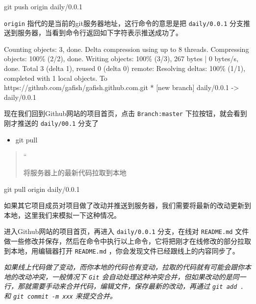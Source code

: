 \documentclass[
]{article}
\newenvironment{Shaded}{}{}
\newcommand{\NormalTok}[1]{#1}
\begin{document}
\begin{Shaded}
\begin{Highlighting}[]
\NormalTok{git push origin daily/0.0.1}
\end{Highlighting}
\end{Shaded}

\texttt{origin} 指代的是当前的git服务器地址，这行命令的意思是把
\texttt{daily/0.0.1}
分支推送到服务器，当看到命令行返回如下字符表示推送成功了。

\begin{Shaded}
\begin{Highlighting}[]
\NormalTok{Counting objects: 3, done.}
\NormalTok{Delta compression using up to 8 threads.}
\NormalTok{Compressing objects: 100\% (2/2), done.}
\NormalTok{Writing objects: 100\% (3/3), 267 bytes | 0 bytes/s, done.}
\NormalTok{Total 3 (delta 1), reused 0 (delta 0)}
\NormalTok{remote: Resolving deltas: 100\% (1/1), completed with 1 local objects.}
\NormalTok{To https://github.com/gafish/gafish.github.com.git}
\NormalTok{ * [new branch]      daily/0.0.1 {-}\textgreater{} daily/0.0.1}
\end{Highlighting}
\end{Shaded}

现在我们回到Github网站的项目首页，点击 \texttt{Branch:master}
下拉按钮，就会看到刚才推送的 \texttt{daily/00.1} 分支了

\begin{itemize}
\item
  git pull
\end{itemize}

\begin{quote}
``

将服务器上的最新代码拉取到本地
\end{quote}

\begin{Shaded}
\begin{Highlighting}[]
\NormalTok{git pull origin daily/0.0.1}
\end{Highlighting}
\end{Shaded}

如果其它项目成员对项目做了改动并推送到服务器，我们需要将最新的改动更新到本地，这里我们来模拟一下这种情况。

进入Github网站的项目首页，再进入 \texttt{daily/0.0.1} 分支，在线对
\texttt{README.md}
文件做一些修改并保存，然后在命令中执行以上命令，它将把刚才在线修改的部分拉取到本地，用编辑器打开
\texttt{README.md} ，你会发现文件已经跟线上的内容同步了。

\emph{如果线上代码做了变动，而你本地的代码也有变动，拉取的代码就有可能会跟你本地的改动冲突，一般情况下
\texttt{Git}
会自动处理这种冲突合并，但如果改动的是同一行，那就需要手动来合并代码，编辑文件，保存最新的改动，再通过
\texttt{git\ add\ .} 和
\texttt{git\ commit\ -m\ \textquotesingle{}xxx\textquotesingle{}}
来提交合并。}
\end{document}
